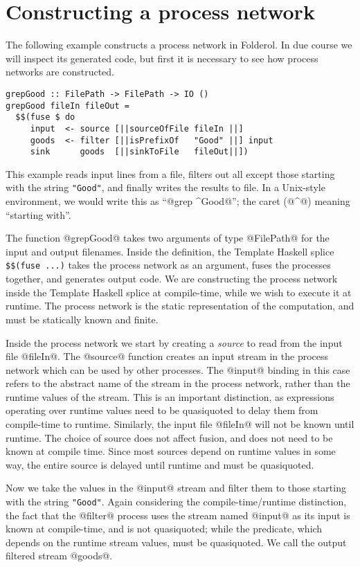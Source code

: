\section{Constructing a process network}
\label{s:extraction:grepGood}

The following example constructs a process network in Folderol.
In due course we will inspect its generated code, but first it is necessary to see how process networks are constructed.

\begin{lstlisting}
grepGood :: FilePath -> FilePath -> IO ()
grepGood fileIn fileOut =
  $$(fuse $ do
     input  <- source [||sourceOfFile fileIn ||]
     goods  <- filter [||isPrefixOf   "Good" ||] input
     sink      goods  [||sinkToFile   fileOut||])
\end{lstlisting}

This example reads input lines from a file, filters out all except those starting with the string \lstinline/"Good"/, and finally writes the results to file.
In a Unix-style environment, we would write this as ``@grep ^Good@''; the caret (@^@) meaning ``starting with''.

The function @grepGood@ takes two arguments of type @FilePath@ for the input and output filenames.
Inside the definition, the Template Haskell splice \lstinline/$$(fuse ...)/ takes the process network as an argument, fuses the processes together, and generates output code.
We are constructing the process network inside the Template Haskell splice at compile-time, while we wish to execute it at runtime.
The process network is the static representation of the computation, and must be statically known and finite.

Inside the process network we start by creating a \emph{source} to read from the input file @fileIn@.
The @source@ function creates an input stream in the process network which can be used by other processes.
The @input@ binding in this case refers to the abstract name of the stream in the process network, rather than the runtime values of the stream.
This is an important distinction, as expressions operating over runtime values need to be quasiquoted to delay them from compile-time to runtime.
Similarly, the input file @fileIn@ will not be known until runtime.
The choice of source does not affect fusion, and does not need to be known at compile time.
Since most sources depend on runtime values in some way, the entire source is delayed until runtime and must be quasiquoted.

Now we take the values in the @input@ stream and filter them to those starting with the string \lstinline/"Good"/.
Again considering the compile-time/runtime distinction, the fact that the @filter@ process uses the stream named @input@ as its input is known at compile-time, and is not quasiquoted; while the predicate, which depends on the runtime stream values, must be quasiquoted.
We call the output filtered stream @goods@.

